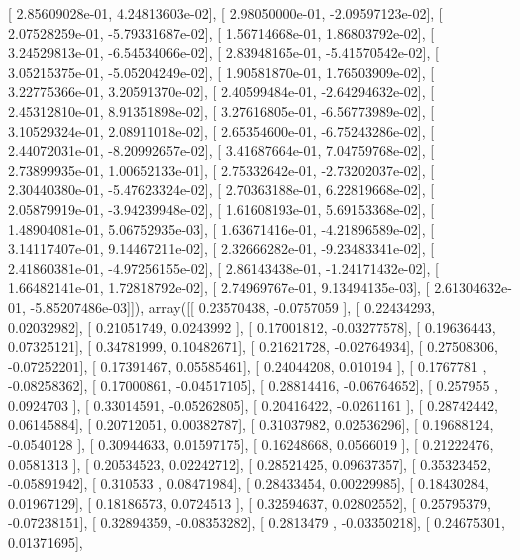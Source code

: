 \documentclass{article}
\begin{document}
       [  2.85609028e-01,   4.24813603e-02],
       [  2.98050000e-01,  -2.09597123e-02],
       [  2.07528259e-01,  -5.79331687e-02],
       [  1.56714668e-01,   1.86803792e-02],
       [  3.24529813e-01,  -6.54534066e-02],
       [  2.83948165e-01,  -5.41570542e-02],
       [  3.05215375e-01,  -5.05204249e-02],
       [  1.90581870e-01,   1.76503909e-02],
       [  3.22775366e-01,   3.20591370e-02],
       [  2.40599484e-01,  -2.64294632e-02],
       [  2.45312810e-01,   8.91351898e-02],
       [  3.27616805e-01,  -6.56773989e-02],
       [  3.10529324e-01,   2.08911018e-02],
       [  2.65354600e-01,  -6.75243286e-02],
       [  2.44072031e-01,  -8.20992657e-02],
       [  3.41687664e-01,   7.04759768e-02],
       [  2.73899935e-01,   1.00652133e-01],
       [  2.75332642e-01,  -2.73202037e-02],
       [  2.30440380e-01,  -5.47623324e-02],
       [  2.70363188e-01,   6.22819668e-02],
       [  2.05879919e-01,  -3.94239948e-02],
       [  1.61608193e-01,   5.69153368e-02],
       [  1.48904081e-01,   5.06752935e-03],
       [  1.63671416e-01,  -4.21896589e-02],
       [  3.14117407e-01,   9.14467211e-02],
       [  2.32666282e-01,  -9.23483341e-02],
       [  2.41860381e-01,  -4.97256155e-02],
       [  2.86143438e-01,  -1.24171432e-02],
       [  1.66482141e-01,   1.72818792e-02],
       [  2.74969767e-01,   9.13494135e-03],
       [  2.61304632e-01,  -5.85207486e-03]]), array([[ 0.23570438, -0.0757059 ],
       [ 0.22434293,  0.02032982],
       [ 0.21051749,  0.0243992 ],
       [ 0.17001812, -0.03277578],
       [ 0.19636443,  0.07325121],
       [ 0.34781999,  0.10482671],
       [ 0.21621728, -0.02764934],
       [ 0.27508306, -0.07252201],
       [ 0.17391467,  0.05585461],
       [ 0.24044208,  0.010194  ],
       [ 0.1767781 , -0.08258362],
       [ 0.17000861, -0.04517105],
       [ 0.28814416, -0.06764652],
       [ 0.257955  ,  0.0924703 ],
       [ 0.33014591, -0.05262805],
       [ 0.20416422, -0.0261161 ],
       [ 0.28742442,  0.06145884],
       [ 0.20712051,  0.00382787],
       [ 0.31037982,  0.02536296],
       [ 0.19688124, -0.0540128 ],
       [ 0.30944633,  0.01597175],
       [ 0.16248668,  0.0566019 ],
       [ 0.21222476,  0.0581313 ],
       [ 0.20534523,  0.02242712],
       [ 0.28521425,  0.09637357],
       [ 0.35323452, -0.05891942],
       [ 0.310533  ,  0.08471984],
       [ 0.28433454,  0.00229985],
       [ 0.18430284,  0.01967129],
       [ 0.18186573,  0.0724513 ],
       [ 0.32594637,  0.02802552],
       [ 0.25795379, -0.07238151],
       [ 0.32894359, -0.08353282],
       [ 0.2813479 , -0.03350218],
       [ 0.24675301,  0.01371695],
\end{document}
